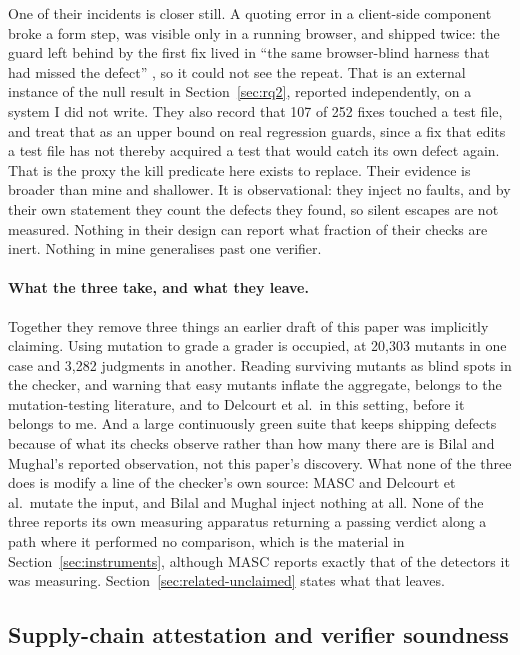 \documentclass[11pt]{article}
\begin{document}
One of their incidents is closer still. A quoting error in a client-side component broke a
form step, was visible only in a running browser, and shipped twice: the guard left behind by
the first fix lived in ``the same browser-blind harness that had missed the defect''
\citep{bilal2026allgreen}, so it could not see the repeat. That is an external instance of
the null result in Section~\ref{sec:rq2}, reported independently, on a system I did not
write. They also record that 107 of 252 fixes touched a test file, and treat that as an
upper bound on real regression guards, since a fix that edits a test file has not thereby
acquired a test that would catch its own defect again. That is the proxy the kill predicate
here exists to replace. Their evidence is broader than mine and shallower. It is
observational: they inject no faults, and by their own statement they count the defects they
found, so silent escapes are not measured. Nothing in their design can report what fraction
of their checks are inert. Nothing in mine generalises past one verifier.

\paragraph{What the three take, and what they leave.} Together they remove three things an
earlier draft of this paper was implicitly claiming. Using mutation to grade a grader is
occupied, at 20,303 mutants in one case and 3,282 judgments in another. Reading surviving
mutants as blind spots in the checker, and warning that easy mutants inflate the aggregate,
belongs to the mutation-testing literature, and to Delcourt et al.\ in this setting, before
it belongs to me. And a large continuously green suite that keeps shipping defects because
of what its checks observe rather than how many there are is Bilal and Mughal's reported
observation, not this paper's discovery. What none of the three does is modify a line of the
checker's own source: MASC and Delcourt et al.\ mutate the input, and Bilal and Mughal
inject nothing at all. None of the three reports its own measuring apparatus returning a
passing verdict along a path where it performed no comparison, which is the material in
Section~\ref{sec:instruments}, although MASC reports exactly that of the detectors it was
measuring. Section~\ref{sec:related-unclaimed} states what that leaves.

\subsection{Supply-chain attestation and verifier soundness}
\end{document}

